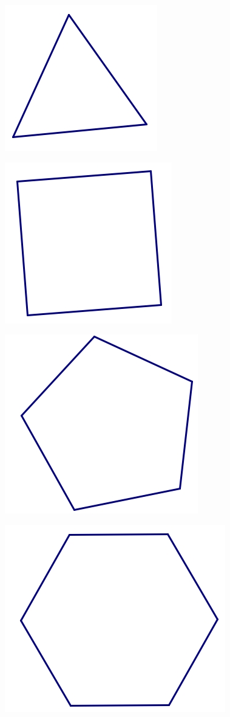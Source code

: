 \documentclass[12pt, reqno]{amsart}
\theoremstyle{remark}
\theoremstyle{definition}
\numberwithin{equation}{section}  %
\begin{document}
\begin{center}
\includegraphics{eqtri}

\includegraphics{square3}

\includegraphics{pentagon}

\includegraphics[scale = .75]{hexagon}


\end{center}
\end{document}
